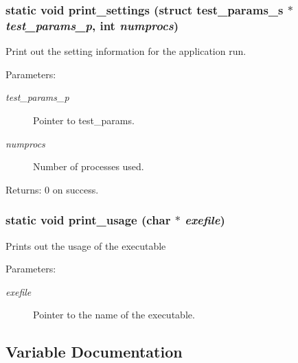 \subsubsection{\setlength{\rightskip}{0pt plus 5cm}static void print\_\-settings (struct \bf{test\_\-params\_\-s} $\ast$ {\em test\_\-params\_\-p}, int {\em numprocs})\hspace{0.3cm}{\tt  [static]}}\label{s3asim_8c_48170032dcec467ca7eff1ce72632181}


Print out the setting information for the application run.

\begin{Desc}
\item[Parameters:]
\begin{description}
\item[{\em test\_\-params\_\-p}]Pointer to test\_\-params. \item[{\em numprocs}]Number of processes used. \end{description}
\end{Desc}
\begin{Desc}
\item[Returns:]0 on success. \end{Desc}
\subsubsection{\setlength{\rightskip}{0pt plus 5cm}static void print\_\-usage (char $\ast$ {\em exefile})\hspace{0.3cm}{\tt  [static]}}\label{s3asim_8c_f708640d8a6325e5147c42c631c7552a}


Prints out the usage of the executable

\begin{Desc}
\item[Parameters:]
\begin{description}
\item[{\em exefile}]Pointer to the name of the executable. \end{description}
\end{Desc}


\subsection{Variable Documentation}
